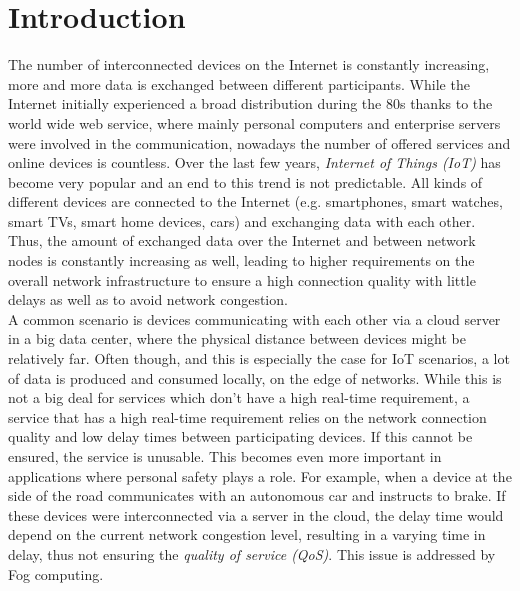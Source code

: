 \chapter{Introduction\label{cha:chapter1}}

The number of interconnected devices on the Internet is constantly increasing, more and more data is exchanged between different participants.
While the Internet initially experienced a broad distribution during the 80s thanks to the world wide web service, where mainly personal computers and enterprise servers were involved in the communication, nowadays the number of offered services and online devices is countless.
Over the last few years, \textit{Internet of Things (IoT)} has become very popular and an end to this trend is not predictable.
All kinds of different devices are connected to the Internet (e.g. smartphones, smart watches, smart TVs, smart home devices, cars) and exchanging data with each other.
Thus, the amount of exchanged data over the Internet and between network nodes is constantly increasing as well, leading to higher requirements on the overall network infrastructure to ensure a high connection quality with little delays as well as to avoid network congestion.\\

A common scenario is devices communicating with each other via a cloud server in a big data center, where the physical distance between devices might be relatively far.
Often though, and this is especially the case for IoT scenarios, a lot of data is produced and consumed locally, on the edge of networks.
While this is not a big deal for services which don’t have a high real-time requirement, a service that has a high real-time requirement relies on the network connection quality and low delay times between participating devices.
If this cannot be ensured, the service is unusable.
This becomes even more important in applications where personal safety plays a role.
For example, when a device at the side of the road communicates with an autonomous car and instructs to brake.
If these devices were interconnected via a server in the cloud, the delay time would depend on the current network congestion level, resulting in a varying time in delay, thus not ensuring the \textit{quality of service (QoS)}.
This issue is addressed by Fog computing.\\

